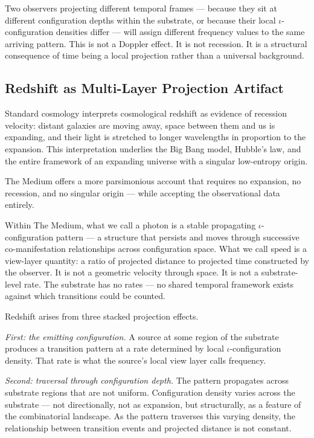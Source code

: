 \documentclass[11pt,letterpaper]{article}
\begin{document}
Two observers projecting different temporal frames --- because they sit at different configuration depths within the substrate, or because their local \(\iota\)-configuration densities differ --- will assign different frequency values to the same arriving pattern. This is not a Doppler effect. It is not recession. It is a structural consequence of time being a local projection rather than a universal background.

\subsection{Redshift as Multi-Layer Projection Artifact}
\label{sec:org78c9ef3}

Standard cosmology interprets cosmological redshift as evidence of recession velocity: distant galaxies are moving away, space between them and us is expanding, and their light is stretched to longer wavelengths in proportion to the expansion. This interpretation underlies the Big Bang model, Hubble's law, and the entire framework of an expanding universe with a singular low-entropy origin.

The Medium offers a more parsimonious account that requires no expansion, no recession, and no singular origin --- while accepting the observational data entirely.

Within The Medium, what we call a photon is a stable propagating \(\iota\)-configuration pattern --- a structure that persists and moves through successive co-manifestation relationships across configuration space. What we call speed is a view-layer quantity: a ratio of projected distance to projected time constructed by the observer. It is not a geometric velocity through space. It is not a substrate-level rate. The substrate has no rates --- no shared temporal framework exists against which transitions could be counted.

Redshift arises from three stacked projection effects.

\emph{First: the emitting configuration.} A source at some region of the substrate produces a transition pattern at a rate determined by local \(\iota\)-configuration density. That rate is what the source's local view layer calls frequency.

\emph{Second: traversal through configuration depth.} The pattern propagates across substrate regions that are not uniform. Configuration density varies across the substrate --- not directionally, not as expansion, but structurally, as a feature of the combinatorial landscape. As the pattern traverses this varying density, the relationship between transition events and projected distance is not constant.
\end{document}

